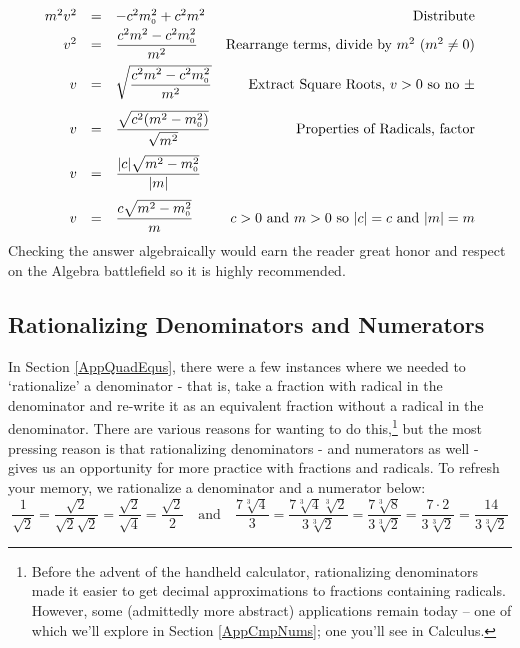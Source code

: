 \documentclass{ximera}
\begin{document}
\begin{example}
\begin{enumerate}
\[\begin{array}{rclr}
m^2 v^2 & = & -c^2m_{\text{\tiny$0$}}^{2} + c^2 m^2 & \text{Distribute} \\[2pt]

v^2  & = & \dfrac{c^2 m^2 -c^2m_{\text{\tiny$0$}}^{2}}{m^2} & \text{Rearrange terms, divide by $m^2$ ($m^2 \neq 0$)} \\[8pt]

v & = & \sqrt{\dfrac{c^2 m^2 -c^2m_{\text{\tiny$0$}}^{2}}{m^2}} & \text{Extract Square Roots, $v > 0$ so no $\pm$} \\[12pt]

v & = & \dfrac{\sqrt{c^2 (m^2 -m_{\text{\tiny$0$}}^{2})}}{\sqrt{m^2}} & \text{Properties of Radicals, factor} \\[12pt]

v & = & \dfrac{|c|\sqrt{m^2 -m_{\text{\tiny$0$}}^{2}}}{|m|} &  \\[12pt]

v & = & \dfrac{c\sqrt{m^2 -m_{\text{\tiny$0$}}^{2}}}{m} & \text{$c > 0$ and $m > 0$ so $|c| = c$ and $|m| = m$} \\

\end{array}\] Checking the answer algebraically would earn the reader great honor and respect on the Algebra battlefield so it is highly recommended.

\end{enumerate}

\end{example}

\subsection{Rationalizing Denominators and Numerators}
\label{rationalizingdenomandnumer}

In Section \ref{AppQuadEqus}, there were a few instances where we needed to `rationalize' a denominator - that is, take a fraction with radical in the denominator and re-write it as an equivalent fraction without a radical in the denominator.  There are various reasons for wanting to do this,\footnote{Before the advent of the handheld calculator, rationalizing denominators made it easier to get decimal approximations to fractions containing radicals.   However, some (admittedly more abstract) applications remain today --  one of which we'll explore in Section \ref{AppCmpNums}; one you'll see in Calculus.} but the most pressing reason is that rationalizing denominators - and numerators as well - gives us an opportunity for more practice with fractions and radicals. To refresh your memory, we rationalize a denominator and a numerator below: \[ \dfrac{1}{\sqrt{2}} = \dfrac{\sqrt{2}}{\sqrt{2} \sqrt{2}} = \dfrac{\sqrt{2}}{\sqrt{4}} = \dfrac{\sqrt{2}}{2} \quad \text{and} \quad \dfrac{7\sqrt[3]{4}}{3} = \dfrac{7 \sqrt[3]{4}\sqrt[3]{2}}{3\sqrt[3]{2}} = \dfrac{7\sqrt[3]{8}}{3\sqrt[3]{2}} = \dfrac{7 \cdot 2}{3\sqrt[3]{2}} =  \dfrac{14}{3\sqrt[3]{2}} \]
\end{document}
